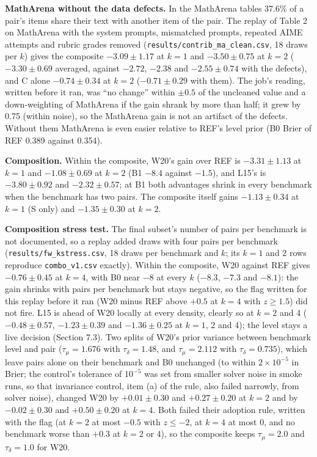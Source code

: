 \documentclass[
]{article}
\begin{document}
\textbf{MathArena without the data defects.} In the MathArena tables
37.6\% of a pair's items share their text with another item of the pair.
The replay of Table 2 on MathArena with the system prompts, mismatched
prompts, repeated AIME attempts and rubric grades removed
(\texttt{results/contrib\_ma\_clean.csv}, 18 draws per \(k\)) gives the
composite \(-3.09 \pm 1.17\) at \(k = 1\) and \(-3.50 \pm 0.75\) at
\(k = 2\) (\(-3.30 \pm 0.69\) averaged, against \(-2.72\), \(-2.38\) and
\(-2.55 \pm 0.74\) with the defects), and C alone \(-0.74 \pm 0.34\) at
\(k = 2\) (\(-0.71 \pm 0.29\) with them). The job's reading, written
before it ran, was ``no change'' within \(\pm 0.5\) of the uncleaned
value and a down-weighting of MathArena if the gain shrank by more than
half; it grew by 0.75 (within noise), so the MathArena gain is not an
artifact of the defects. Without them MathArena is even easier relative
to REF's level prior (B0 Brier of REF 0.389 against 0.354).

\textbf{Composition.} Within the composite, W20's gain over REF is
\(-3.31 \pm 1.13\) at \(k = 1\) and \(-1.08 \pm 0.69\) at \(k =
2\) (B1 \(-8.4\) against \(-1.5\)), and L15's is \(-3.80 \pm 0.92\) and
\(-2.32 \pm 0.57\); at B1 both advantages shrink in every benchmark when
the benchmark has two pairs. The composite itself gains
\(-1.13 \pm 0.34\) at \(k = 1\) (S only) and \(-1.35
\pm 0.30\) at \(k = 2\).

\textbf{Composition stress test.} The final subset's number of pairs per
benchmark is not documented, so a replay added draws with four pairs per
benchmark (\texttt{results/fw\_kstress.csv}, 18 draws per benchmark and
\(k\); its \(k = 1\) and 2 rows reproduce \texttt{combo\_v1.csv}
exactly). Within the composite, W20 against REF gives \(-0.76 \pm 0.45\)
at \(k = 4\), with B0 near \(-8\) at every \(k\) (\(-8.3\), \(-7.3\) and
\(-8.1\)): the gain shrinks with pairs per benchmark but stays negative,
so the flag written for this replay before it ran (W20 minus REF above
\(+0.5\) at \(k = 4\) with \(z \ge 1.5\)) did not fire. L15 is ahead of
W20 locally at every density, clearly so at \(k = 2\) and 4
(\(-0.48 \pm 0.57\), \(-1.23 \pm 0.39\) and \(-1.36 \pm 0.25\) at
\(k = 1\), 2 and 4); the level stays a live decision (Section 7.3). Two
splits of W20's prior variance between benchmark level and pair
(\(\tau_\mu = 1.676\) with \(\tau_\delta = 1.48\), and
\(\tau_\mu = 2.112\) with \(\tau_\delta = 0.735\)), which leave pairs
alone on their benchmark and B0 unchanged (to within
\(2 \times 10^{-5}\) in Brier; the control's tolerance of \(10^{-5}\)
was set from smaller solver noise in smoke runs, so that invariance
control, item (a) of the rule, also failed narrowly, from solver noise),
changed W20 by \(+0.01 \pm 0.30\) and \(+0.27 \pm 0.20\) at \(k = 2\)
and by \(-0.02 \pm 0.30\) and \(+0.50 \pm 0.20\) at \(k = 4\). Both
failed their adoption rule, written with the flag (at \(k = 2\) at most
\(-0.5\) with \(z \le -2\), at \(k = 4\) at most 0, and no benchmark
worse than \(+0.3\) at \(k = 2\) or 4), so the composite keeps
\(\tau_\mu = 2.0\) and \(\tau_\delta = 1.0\) for W20.
\end{document}
